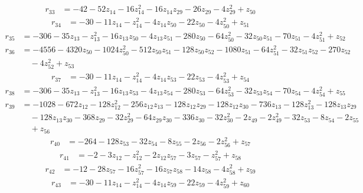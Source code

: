 \begin{align*}
r_{33} &= -42 - 52z_{14} - 16z_{14}^{2} - 16z_{14}z_{29} - 26z_{29} - 4z_{29}^{2} + z_{50}
\end{align*}
\begin{align*}
r_{34} &= -30 - 11z_{14} - z_{14}^{2} - 4z_{14}z_{50} - 22z_{50} - 4z_{50}^{2} + z_{51}
\end{align*}
\begin{align*}
r_{35} &= -306 - 35z_{13} - z_{13}^{2} - 16z_{13}z_{50} - 4z_{13}z_{51} - 280z_{50} - 64z_{50}^{2} - 32z_{50}z_{51} - 70z_{51} - 4z_{51}^{2} + z_{52}
\end{align*}
\begin{align*}
r_{36} &= -4556 - 4320z_{50} - 1024z_{50}^{2} - 512z_{50}z_{51} - 128z_{50}z_{52} - 1080z_{51} - 64z_{51}^{2} - 32z_{51}z_{52} - 270z_{52} \\
&\quad  - 4z_{52}^{2} + z_{53}
\end{align*}
\begin{align*}
r_{37} &= -30 - 11z_{14} - z_{14}^{2} - 4z_{14}z_{53} - 22z_{53} - 4z_{53}^{2} + z_{54}
\end{align*}
\begin{align*}
r_{38} &= -306 - 35z_{13} - z_{13}^{2} - 16z_{13}z_{53} - 4z_{13}z_{54} - 280z_{53} - 64z_{53}^{2} - 32z_{53}z_{54} - 70z_{54} - 4z_{54}^{2} + z_{55}
\end{align*}
\begin{align*}
r_{39} &= -1028 - 672z_{12} - 128z_{12}^{2} - 256z_{12}z_{13} - 128z_{12}z_{29} - 128z_{12}z_{30} - 736z_{13} - 128z_{13}^{2} - 128z_{13}z_{29} \\
&\quad  - 128z_{13}z_{30} - 368z_{29} - 32z_{29}^{2} - 64z_{29}z_{30} - 336z_{30} - 32z_{30}^{2} - 2z_{49} - 2z_{49}^{2} - 32z_{53} - 8z_{54} - 2z_{55} \\
&\quad  + z_{56}
\end{align*}
\begin{align*}
r_{40} &= -264 - 128z_{53} - 32z_{54} - 8z_{55} - 2z_{56} - 2z_{56}^{2} + z_{57}
\end{align*}
\begin{align*}
r_{41} &= -2 - 3z_{12} - z_{12}^{2} - 2z_{12}z_{57} - 3z_{57} - z_{57}^{2} + z_{58}
\end{align*}
\begin{align*}
r_{42} &= -12 - 28z_{57} - 16z_{57}^{2} - 16z_{57}z_{58} - 14z_{58} - 4z_{58}^{2} + z_{59}
\end{align*}
\begin{align*}
r_{43} &= -30 - 11z_{14} - z_{14}^{2} - 4z_{14}z_{59} - 22z_{59} - 4z_{59}^{2} + z_{60}
\end{align*}
